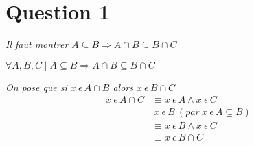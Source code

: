 \section*{Question 1}
\noindent
\emph{Il faut montrer $ A \subseteq B \Rightarrow A \cap B \subseteq B \cap C$}
\bigskip

\centerline{$\forall A,B,C \mid A \subseteq B \Rightarrow A \cap B \subseteq B \cap C$}
\bigskip
\noindent
\emph{On pose que si $x\ \epsilon\ A \cap B$ alors $x\ \epsilon\ B \cap C$}
\begin{align*}
	x\ \epsilon\ A \cap C &\equiv x\ \epsilon\ A \wedge x\ \epsilon\ C\\
	&\ x\ \epsilon\ B\ (par\ x\ \epsilon\ A \subseteq B)\\
	&\equiv x\ \epsilon\ B \wedge x\ \epsilon\ C\\
	&\equiv x\ \epsilon\ B \cap C
\end{align*}